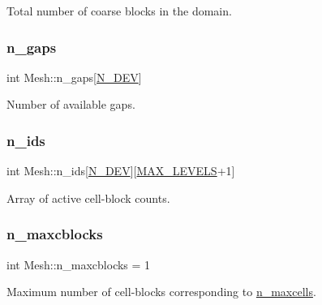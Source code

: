 Total number of coarse blocks in the domain. 

\mbox{\label{classMesh_ab4b00fa4b614ac8ebbaefcf7e08e0680}} 
\subsubsection{\texorpdfstring{n\+\_\+gaps}{n\_gaps}}
{\footnotesize\ttfamily int Mesh\+::n\+\_\+gaps\mbox{[}\hyperlink{cppspec_8h_a2b674dab7a14f1bf32b48b7fda5022dc}{N\+\_\+\+D\+EV}\mbox{]}}



Number of available gaps. 

\mbox{\label{classMesh_adfba87c2fca6988d3e41e40c0597bd38}} 
\subsubsection{\texorpdfstring{n\+\_\+ids}{n\_ids}}
{\footnotesize\ttfamily int Mesh\+::n\+\_\+ids\mbox{[}\hyperlink{cppspec_8h_a2b674dab7a14f1bf32b48b7fda5022dc}{N\+\_\+\+D\+EV}\mbox{]}\mbox{[}\hyperlink{cppspec_8h_add784659439a8dd6b1423406171414d3}{M\+A\+X\+\_\+\+L\+E\+V\+E\+LS}+1\mbox{]}}



Array of active cell-\/block counts. 

\mbox{\label{classMesh_a06747b090209a57051f35bce181ffec0}} 
\subsubsection{\texorpdfstring{n\+\_\+maxcblocks}{n\_maxcblocks}}
{\footnotesize\ttfamily int Mesh\+::n\+\_\+maxcblocks = 1}



Maximum number of cell-\/blocks corresponding to \hyperlink{classMesh_a106dbb299d9e9f754438d903846102df}{n\+\_\+maxcells}. 

\mbox{\label{classMesh_a106dbb299d9e9f754438d903846102df}} 
